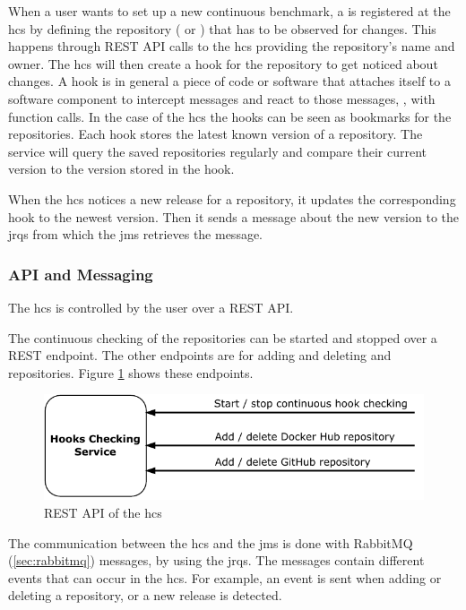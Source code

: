 When a user wants to set up a new continuous benchmark, a \ts{} is registered at the \ac{hcs} by defining the repository (\gh{} or \dockh{}) that has to be observed for changes.
This happens through REST API calls to the \ac{hcs} providing the repository's name and owner.
The \ac{hcs} will then create a hook for the repository to get noticed about changes.
A hook is in general a piece of code or software that attaches itself to a software component to intercept messages and react to those messages, \eg, with function calls.
In the case of the \ac{hcs} the hooks can be seen as bookmarks for the repositories.
Each hook stores the latest known version of a repository.
The service will query the saved repositories regularly and compare their current version to the version stored in the hook.

When the \ac{hcs} notices a new release for a repository, it updates the corresponding hook to the newest version.
Then it sends a message about the new version to the \aclp{jrq} from which the \acl{jms} retrieves the message.

\subsubsection{API and Messaging}
\label{sec:hooks_api}
The \ac{hcs} is controlled by the user over a REST API.

The continuous checking of the repositories can be started and stopped over a REST endpoint.
The other endpoints are for adding and deleting \gh{} and \dockh{} repositories.
Figure \ref{fig:rest_apis_approach_hcs} shows these endpoints.
\begin{figure}[tbph]
	\centering
	\includegraphics[width=.57\textwidth]{figures/rest-apis-approach-hcs.pdf}
	\caption{REST API of the \acl{hcs}}
	\label{fig:rest_apis_approach_hcs}
\end{figure}

The communication between the \ac{hcs} and the \acl{jms} is done with RabbitMQ (\ref{sec:rabbitmq}) messages, by using the \aclp{jrq}.
The messages contain different events that can occur in the \ac{hcs}.
For example, an event is sent when adding or deleting a repository, or a new release is detected.


